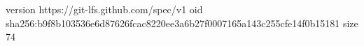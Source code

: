 version https://git-lfs.github.com/spec/v1
oid sha256:b9f8b103536e6d87626fcac8220ee3a6b27f0007165a143c255cfe14f0b15181
size 74
